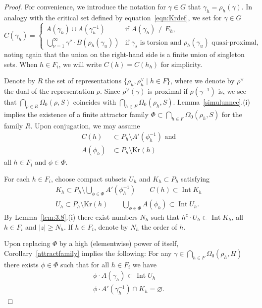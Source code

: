 \documentclass{amsart}
\theoremstyle{plain}
\theoremstyle{definition}
\theoremstyle{remark}
\DeclareMathOperator{\Int}{Int}
\providecommand{\abs}[1]{\lvert#1\rvert}
\begin{document}
\begin{proof}
For convenience, we introduce the notation for $\gamma \in G$ that $\gamma_{h} =
\rho_{h}(\gamma)$. In analogy with the critical set defined by equation~\eqref{eqn:Krdef},
we set for $\gamma \in G$
\begin{equation*}
C(\gamma_{h}) = \begin{cases}
A(\gamma_{h}) \cup A(\gamma_{h}^{-1})& \text{if $A(\gamma_{h}) \neq E_{h}$},\\
\bigcup_{\nu = 1}^{\infty}\gamma^{\nu}\cdot B(\rho_{h}(\gamma_{u}))& \text{if $\gamma_{s}$ is
torsion and $\rho_{h}(\gamma_{u})$ quasi-proximal},
\end{cases}
\end{equation*}
noting again that the union on the right-hand side is a finite union of
singleton sets. When $h \in F_{i}$, we will write
$C(h) = C(h_{h})$ for simplicity.

Denote by $R$ the set of representations $\{\rho_{h}, \rho_{h}^{\vee}\mid h \in F\}$, where
we denote by $\rho^{\vee}$ the dual of the representation $\rho$. Since
$\rho^{\vee}(\gamma)$ is proximal if $\rho(\gamma^{-1})$ is, we see that
$\bigcap_{\rho \in R} \Omega_{0}(\rho, S)$ coincides with
$\bigcap_{h \in F} \Omega_{0}(\rho_{h}, S)$. Lemma~\ref{simulunnec}.(i) implies the
existence of a finite attractor family $\Phi \subset \bigcap_{h \in F} \Omega_{0}(\rho_{h},
S)$ for the family $R$. Upon conjugation, we may assume
\begin{align*}
C(h)&\subset P_{h}\setminus A'(\phi_{h}^{-1})\text{ and}\\
A(\phi_{h})&\subset P_{h}\setminus\mathrm{Kr}(h)
\end{align*}
all $h \in F_{i}$ and $\phi \in \Phi$.

For each $h \in F_{i}$, choose compact subsets $U_{h}$ and $K_{h} \subset
P_{h}$ satisfying
\begin{gather*}
K_{h} \subset P_{h}\setminus \bigcup_{\phi \in \Phi} A'(\phi_{h}^{-1})\qquad C(h)\subset
\Int K_{h}\\
U_{h} \subset P_{h} \setminus \mathrm{Kr}(h)\qquad \bigcup_{\phi \in \Phi} A(\phi_{h}) \subset \Int
U_{h}.
\end{gather*}
By Lemma~\ref{lem:3.8}.(i) there exist numbers $N_{h}$ such that $h^{z} \cdot U_{h}
\subset \Int K_{h}$, all $h \in F_{i}$ and $\abs{z} \geqslant N_{h}$. If $h \in F_{t}$,
denote by $N_{h}$ the order of $h$.

Upon replacing $\Phi$ by a high (elementwise) power of itself,
Corollary~\ref{attractfamily} implies the following: For any $\gamma \in \bigcap_{h \in F}
\Omega_{0}(\rho_{h}, H)$ there exists $\phi \in \Phi$ such that for all $h \in
F_{i}$ we have
\begin{gather}
\phi\cdot A(\gamma_{h}) \subset \Int U_{h}\label{attractor1}\\
\phi\cdot A'(\gamma_{h}^{-1}) \cap K_{h} = \varnothing. \label{attractor2}
\end{gather}


\end{proof}
\end{document}
